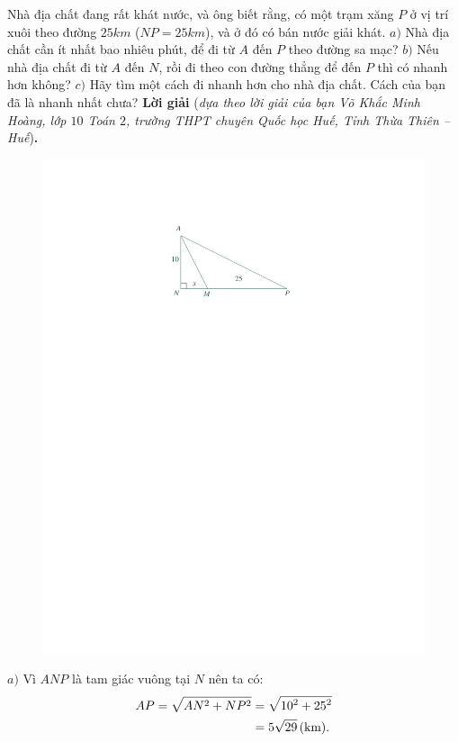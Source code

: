 \begin{multicols}{2}
\begin{figure}[H]
	\end{figure}
	Nhà địa chất đang rất khát nước, và ông biết rằng, có một trạm xăng $P$ ở vị trí xuôi theo đường $25km$ ($NP = 25km$), và ở đó có bán nước giải khát.
	\vskip 0.05cm
	$a)$ Nhà địa chất cần ít nhất bao nhiêu phút, để đi từ $A$ đến $P$ theo đường sa mạc?
	\vskip 0.05cm
	$b)$ Nếu nhà địa chất đi từ $A$ đến $N$, rồi đi theo con đường thẳng để đến $P$ thì có nhanh hơn không?
	\vskip 0.05cm
	$c)$ Hãy tìm một cách đi nhanh hơn cho nhà địa chất. Cách của bạn đã là nhanh nhất chưa?
	\vskip 0.05cm
	\textbf{\color{thachthuctoanhoc}Lời giải} (\textit{dựa theo lời giải của bạn Võ Khắc Minh Hoàng, lớp $10$ Toán $2$, trường THPT chuyên Quốc học Huế, Tỉnh Thừa Thiên -- Huế})\textbf{\color{thachthuctoanhoc}.}
	\begin{figure}[H]
		\centering
		\vspace*{-10pt}
		\captionsetup{labelformat= empty, justification=centering}
		\includegraphics[width=.8\linewidth]{P597a}
		\vspace*{-10pt}
	\end{figure}
	$a)$ Vì $ANP$ là tam giác vuông tại $N$ nên ta có:
	\begin{align*}
		AP = \sqrt {A{N^2} + N{P^2}}  &= \sqrt {{{10}^2} + {{25}^2}}  \\
		&= 5\sqrt {29} \,({\text{\color{black}km}}).

\end{align*}
\end{multicols}
